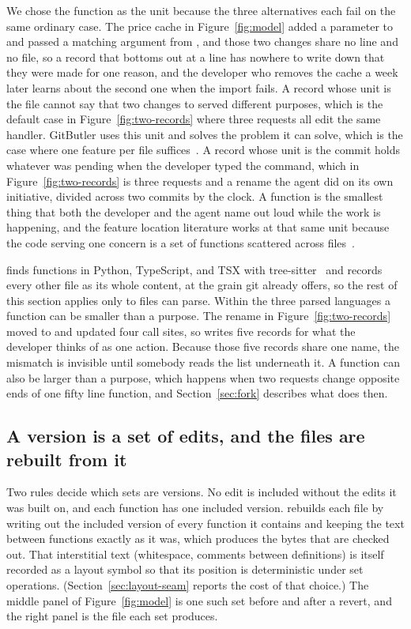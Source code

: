 We chose the function as the unit because the three alternatives each fail on the
same ordinary case. The price cache in Figure~\ref{fig:model} added a parameter to
 and passed a matching argument from , and
those two changes share no line and no file, so a record that bottoms out at a line
has nowhere to write down that they were made for one reason, and the developer who
removes the cache a week later learns about the second one when the import fails. A
record whose unit is the file cannot say that two changes to  served
different purposes, which is the default case in Figure~\ref{fig:two-records} where
three requests all edit the same handler. GitButler uses this unit and solves the
problem it can solve, which is the case where one feature per file
suffices~\cite{gitbutler2026}. A record whose unit is the commit holds whatever was
pending when the developer typed the command, which in
Figure~\ref{fig:two-records} is three requests and a rename the agent did on its
own initiative, divided across two commits by the clock. A function is the smallest
thing that both the developer and the agent name out loud while the work is
happening, and the feature location literature works at that same unit because the
code serving one concern is a set of functions scattered across
files~\cite{biggerstaff1993,dit2013}.

\sgt{} finds functions in Python, TypeScript, and TSX with
tree-sitter~\cite{treesitter} and records every other file as its whole content, at
the grain git already offers, so the rest of this section applies only to files
\sgt{} can parse. Within the three parsed languages a function can be smaller than a purpose. The
rename in Figure~\ref{fig:two-records} moved  to
 and updated four call sites, so \sgt{} writes five records for
what the developer thinks of as one action. Because those five records share one
name, the mismatch is invisible until somebody reads the list underneath it. A function can also be
larger than a purpose, which happens when two requests change opposite ends of one
fifty line function, and Section~\ref{sec:fork} describes what \sgt{} does then.

\subsection{A version is a set of edits, and the files are rebuilt from it}
\label{sec:sets}

Two rules decide which sets are versions. No edit is included without the edits it
was built on, and each function has one included version. \sgt{} rebuilds each file
by writing out the included version of every function it contains and keeping the
text between functions exactly as it was, which produces the bytes that are checked
out. That interstitial text (whitespace, comments between definitions) is itself
recorded as a layout symbol so that its position is deterministic under
set operations. (Section~\ref{sec:layout-seam} reports the cost of that choice.)
The middle panel of Figure~\ref{fig:model} is one such set before and after a
revert, and the right panel is the file each set produces.

